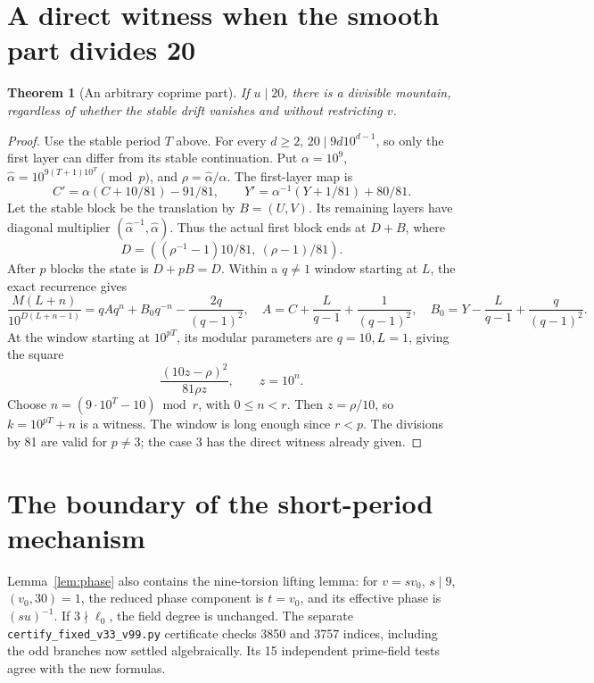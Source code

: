 \documentclass[10pt]{article}
\newtheorem{theorem}{Theorem}
\begin{document}
\section{A direct witness when the smooth part divides 20}
\begin{theorem}[An arbitrary coprime part]
If \(u\mid20\), there is a divisible mountain, regardless of whether
the stable drift vanishes and without restricting \(v\).
\end{theorem}
\begin{proof}
Use the stable period \(T\) above. For every \(d\ge2\),
\(20\mid9d10^{d-1}\), so only the first layer can differ from its
stable continuation. Put \(\alpha=10^9\),
\(\widehat\alpha=10^{9(T+1)10^T}\pmod p\),
and \(\rho=\widehat\alpha/\alpha\). The first-layer map is
\[
C'=\alpha(C+10/81)-91/81,\qquad
Y'=\alpha^{-1}(Y+1/81)+80/81.
\]
Let the stable block be the translation by \(B=(U,V)\).
Its remaining layers have diagonal multiplier
\((\widehat\alpha^{-1},\widehat\alpha)\). Thus the actual first
block ends at \(D+B\), where
\[
D=((\rho^{-1}-1)10/81,\ (\rho-1)/81).
\]
After \(p\) blocks the state is \(D+pB=D\).
Within a \(q\ne1\) window starting at \(L\), the exact recurrence gives
\[
\frac{M(L+n)}{10^{D(L+n-1)}}=qAq^n+B_0q^{-n}-\frac{2q}{(q-1)^2},
\quad
A=C+\frac L{q-1}+\frac1{(q-1)^2},\quad
B_0=Y-\frac L{q-1}+\frac q{(q-1)^2}.
\]
At the window starting at \(10^{pT}\), its modular parameters are
\(q=10,L=1\), giving the square
\[
\frac{(10z-\rho)^2}{81\rho z},\qquad z=10^n.
\]
Choose \(n=(9\cdot10^T-10)\bmod r\), with \(0\le n<r\).
Then \(z=\rho/10\), so \(k=10^{pT}+n\) is a witness. The window
is long enough since \(r<p\). The divisions by 81 are valid for
\(p\ne3\); the case 3 has the direct witness already given.
\end{proof}


\section{The boundary of the short-period mechanism}
Lemma~\ref{lem:phase} also contains the nine-torsion lifting lemma:
for \(v=sv_0\), \(s\mid9\), \((v_0,30)=1\), the reduced phase
component is \(t=v_0\), and its effective phase is \((su)^{-1}\).
If \(3\nmid\ell_0\), the field degree is unchanged. The separate
\texttt{certify\_fixed\_v33\_v99.py} certificate checks 3850 and
3757 indices, including the odd branches now settled algebraically.
Its 15 independent prime-field tests agree with the new formulas.
\end{document}
